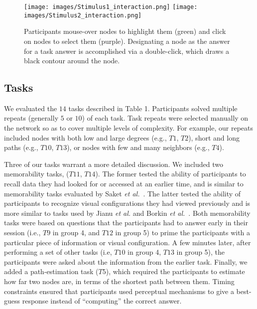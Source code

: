 \begin{figure}[t]
  \centering
  \texttt{[image: images/Stimulus1\_interaction.png]}\hspace{.5cm} \texttt{[image: images/Stimulus2\_interaction.png]}
  \caption{Participants mouse-over nodes to highlight them (green) and click on nodes to select them (purple). Designating a node as the answer for a task answer is accomplished via a double-click, which draws a black contour around the node.}
	\label{fig:interactions}
\end{figure}

\subsection{Tasks}

We evaluated the $14$ tasks described in Table 1. Participants solved multiple repeats (generally $5$ or $10$) of each task. Task repeats were selected manually on the network so as to cover multiple levels of complexity. For example, our repeats included nodes with both low and large degrees (e.g., $T1$, $T2$), short and long paths (e.g., $T10$, $T13$), or nodes with few and many neighbors (e.g., $T4$). 

Three of our tasks warrant a more detailed discussion. We included two memorability tasks, ($T11$, $T14$). The former tested the ability of participants to recall data they had looked for or accessed at an earlier time, and is similar to memorability tasks evaluated by Saket {\it et al.}~\cite{Memorability_Saket2015}. The latter tested the ability of participants to recognize visual configurations they had viewed previously and is more similar to tasks used by Jianu {\it et al.} and Borkin {\it et al.}~\cite{jianu2014display,borkin2013makes}. Both memorability tasks were based on questions that the participants had to answer early in their session (i.e., $T9$ in group 4, and $T12$ in group 5) to prime the participants with a particular piece of information or visual configuration. A few minutes later, after performing a set of other  tasks (i.e, $T10$ in group 4, $T13$ in group 5), the participants were asked about the information from the earlier task. Finally, we added a path-estimation task ($T5$), which required the participants to estimate how far two nodes are, in terms of the shortest path between them. Timing constraints ensured that participants used perceptual mechanisms to give a best-guess response instead of ``computing'' the correct answer.  

